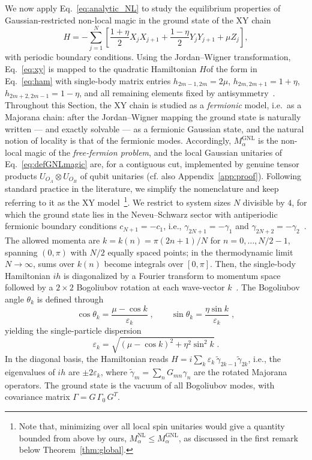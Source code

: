 \documentclass[prx,twocolumn,superscriptaddress,aps,10pt, frontmatterverbose, reprint,footinbib,longbibliography=true]{revtex4-2}
\newcommand{\RENYI}{\alpha}
\providecommand{\DIFaddtex}[1]{{\protect\color{red}#1}} %
\providecommand{\DIFaddbegin}{\protect\color{red}} %
\providecommand{\DIFaddend}{\protect\color{black}} %
\providecommand{\DIFaddtex}[1]{\texorpdfstring{\DIFaddtex{#1}}{#1}} %
\providecommand{\DIFadd}[1]{\texorpdfstring{\DIFaddtex{#1}}{#1}} %
\newcommand{\DIFaddincludegraphics}[2][]{{\color{blue}\fbox{\DIFOincludegraphics[#1]{#2}}}} %
\DeclareRobustCommand{\DIFaddbegin}{\DIFOaddbegin \let\includegraphics\DIFaddincludegraphics} %
\DeclareRobustCommand{\DIFaddend}{\DIFOaddend \let\includegraphics\DIFOincludegraphics} %
\begin{document}
We now apply Eq.~\eqref{eq:analytic_NL} to study the equilibrium properties of Gaussian-restricted non-local magic in the ground state of the XY chain
\begin{equation}
    H = -\sum_{j=1}^{N}\!\left[\frac{1+\eta}{2}X_j X_{j+1} + \frac{1-\eta}{2}Y_j Y_{j+1} + \mu Z_j\right],
    \label{eq:xy}
\end{equation}
with periodic boundary conditions.
Using the Jordan--Wigner transformation, Eq.~\eqref{eq:xy} is mapped to the quadratic Hamiltonian $H$of the form in Eq.~\eqref{eq:ham} with single-body matrix entries $h_{2m-1,2m} = 2\mu$, $h_{2m,2m+1} = 1+\eta$, $h_{2m+2,2m-1} = 1-\eta$, and all remaining elements fixed by antisymmetry~\cite{Mbeng2024}. 
Throughout this Section, the XY chain is studied as a \emph{fermionic} model, i.e.\ as a Majorana chain: after the Jordan--Wigner mapping the ground state is naturally written --- and exactly solvable --- as a fermionic Gaussian state, and the natural notion of locality is that of the fermionic modes. 
Accordingly, $M_\RENYI^{\mathrm{GNL}}$ is the non-local magic of the \textit{free-fermion problem}, and the local Gaussian unitaries of Eq.~\eqref{eq:defGNLmagic} are, for a contiguous cut, implemented by genuine tensor products $U_{O_A}\otimes U_{O_B}$ of qubit unitaries (cf. also Appendix~\ref{app:proof}).
Following standard practice in the literature, we simplify the nomenclature and keep referring to it as the XY model~\footnote{Note that, minimizing over all local spin unitaries would give a quantity bounded from above by ours, $M_\RENYI^{\mathrm{NL}}\le M_\RENYI^{\mathrm{GNL}}$, as discussed in the first remark below Theorem~\ref{thm:global}.}. 
We restrict to system sizes $N$ divisible by $4$, for which the ground state lies in the Neveu--Schwarz sector with antiperiodic fermionic boundary
conditions \DIFaddbegin \DIFadd{$c_{N+1}=-c_1$, i.e., $\gamma_{2N+1}=-\gamma_1$ and $\gamma_{2N+2}=-\gamma_2$}\DIFaddend ~\cite{Mbeng2024}.
The allowed momenta are 
$k=k(n)= \pi(2n+1)/N$ for $n = 0,\dots, N/2-1$, 
spanning $(0,\pi)$ with $N/2$ equally spaced points; 
in the thermodynamic limit $N\to\infty$, sums over $k(n)$ 
become integrals over $[0,\pi]$.
Then, the single-body Hamiltonian $ih$ is diagonalized by a Fourier transform to momentum space followed by a $2\times 2$ Bogoliubov rotation at each wave-vector $k$~\cite{Mbeng2024}.
The Bogoliubov angle $\theta_k$ is defined through
\begin{equation}
    \cos\theta_k = \frac{\mu - \cos k}{\varepsilon_k}\;,\qquad \sin\theta_k = \frac{\eta\sin k}{\varepsilon_k}\;,
    \label{eq:bogoliubov_angle}
\end{equation}
yielding the single-particle dispersion
\begin{equation}
    \varepsilon_k = \sqrt{(\mu-\cos k)^2 + \eta^2\sin^2 k}\;.
    \label{eq:dispersion}
\end{equation}
In the diagonal basis, the Hamiltonian reads \DIFaddbegin \DIFadd{$H = i\sum_k \varepsilon_k\,\tilde\gamma_{2k-1}\tilde\gamma_{2k}$, i.e., the eigenvalues of $ih$ are $\pm2\varepsilon_k$}\DIFaddend , where $\tilde\gamma_m = \sum_n G_{mn}\gamma_n$ are the rotated Majorana operators.
The ground state is the vacuum of all Bogoliubov modes, with covariance matrix $\Gamma = G\,\Gamma_0\, G^T$.
\end{document}
